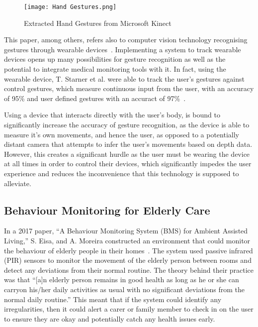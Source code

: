 \begin{figure}[!htb]
    \caption{Extracted Hand Gestures from Microsoft Kinect~\protect\cite{Desa17}}
    \centering
    \texttt{[image: Hand Gestures.png]}
    \label{fig:hand_gestures}
\end{figure}

This paper, among others, refers also to computer vision technology recognising gestures through wearable devices~\cite{Krum00,Star00,Vole22}.
Implementing a system to track wearable devices opens up many possibilities for gesture recognition as well as the potential to integrate medical monitoring tools with it.
In fact, using the wearable device, T. Starner et al. were able to track the user's gestures against control gestures, which measure continuous input from the user, with an accuracy of 95\% and user defined gestures with an accuract of 97\%~\cite{Star00}.

Using a device that interacts directly with the user's body, is bound to significantly increase the accuracy of gesture recognition, as the device is able to measure it's own movements, and hence the user, as opposed to a potentially distant camera that attempts to infer the user's movements based on depth data.
However, this creates a significant hurdle as the user must be wearing the device at all times in order to control their devices, which significantly impedes the user experience and reduces the inconvenience that this technology is supposed to alleviate.

\subsection{Behaviour Monitoring for Elderly Care}
In a 2017 paper, ``A Behaviour Monitoring System (BMS) for Ambient Assisted Living,'' S. Eisa, and A. Moreira constructed an environment that could monitor the behaviour of elderly people in their homes~\cite{Eisa17}.
The system used passive infrared (PIR) sensors to monitor the movement of the elderly person between rooms and detect any deviations from their normal routine.
The theory behind their practice was that ``[a]n elderly person remains in good health as long as he or she can carryon his/her daily activities as usual with no signiﬁcant deviations from the normal daily routine.''
This meant that if the system could identify any irregularities, then it could alert a carer or family member to check in on the user to ensure they are okay and potentially catch any health issues early.


